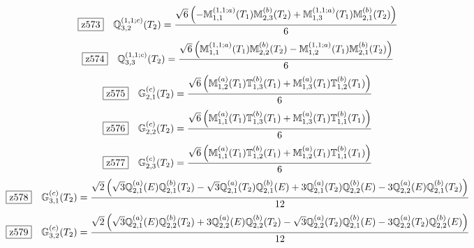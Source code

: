 \documentclass[fleqn,10pt,landscape]{jsarticle}
\begin{document}
\begin{dmath*}
\hspace*{3mm}\fbox{z573}\quad \mathbb{Q}_{3,2}^{(1,1;c)}(T_{2})=\frac{\sqrt{6} \left(- \mathbb{M}_{1,1}^{(1,1;a)}(T_{1}) \mathbb{M}_{2,3}^{(b)}(T_{2}) + \mathbb{M}_{1,3}^{(1,1;a)}(T_{1}) \mathbb{M}_{2,1}^{(b)}(T_{2})\right)}{6}
\end{dmath*}
\begin{dmath*}
\hspace*{3mm}\fbox{z574}\quad \mathbb{Q}_{3,3}^{(1,1;c)}(T_{2})=\frac{\sqrt{6} \left(\mathbb{M}_{1,1}^{(1,1;a)}(T_{1}) \mathbb{M}_{2,2}^{(b)}(T_{2}) - \mathbb{M}_{1,2}^{(1,1;a)}(T_{1}) \mathbb{M}_{2,1}^{(b)}(T_{2})\right)}{6}
\end{dmath*}
\begin{dmath*}
\hspace*{3mm}\fbox{z575}\quad \mathbb{G}_{2,1}^{(c)}(T_{2})=\frac{\sqrt{6} \left(\mathbb{M}_{1,2}^{(a)}(T_{1}) \mathbb{T}_{1,3}^{(b)}(T_{1}) + \mathbb{M}_{1,3}^{(a)}(T_{1}) \mathbb{T}_{1,2}^{(b)}(T_{1})\right)}{6}
\end{dmath*}
\begin{dmath*}
\hspace*{3mm}\fbox{z576}\quad \mathbb{G}_{2,2}^{(c)}(T_{2})=\frac{\sqrt{6} \left(\mathbb{M}_{1,1}^{(a)}(T_{1}) \mathbb{T}_{1,3}^{(b)}(T_{1}) + \mathbb{M}_{1,3}^{(a)}(T_{1}) \mathbb{T}_{1,1}^{(b)}(T_{1})\right)}{6}
\end{dmath*}
\begin{dmath*}
\hspace*{3mm}\fbox{z577}\quad \mathbb{G}_{2,3}^{(c)}(T_{2})=\frac{\sqrt{6} \left(\mathbb{M}_{1,1}^{(a)}(T_{1}) \mathbb{T}_{1,2}^{(b)}(T_{1}) + \mathbb{M}_{1,2}^{(a)}(T_{1}) \mathbb{T}_{1,1}^{(b)}(T_{1})\right)}{6}
\end{dmath*}
\begin{dmath*}
\hspace*{3mm}\fbox{z578}\quad \mathbb{G}_{3,1}^{(c)}(T_{2})=\frac{\sqrt{2} \left(\sqrt{3} \mathbb{Q}_{2,1}^{(a)}(E) \mathbb{Q}_{2,1}^{(b)}(T_{2}) - \sqrt{3} \mathbb{Q}_{2,1}^{(a)}(T_{2}) \mathbb{Q}_{2,1}^{(b)}(E) + 3 \mathbb{Q}_{2,1}^{(a)}(T_{2}) \mathbb{Q}_{2,2}^{(b)}(E) - 3 \mathbb{Q}_{2,2}^{(a)}(E) \mathbb{Q}_{2,1}^{(b)}(T_{2})\right)}{12}
\end{dmath*}
\begin{dmath*}
\hspace*{3mm}\fbox{z579}\quad \mathbb{G}_{3,2}^{(c)}(T_{2})=\frac{\sqrt{2} \left(\sqrt{3} \mathbb{Q}_{2,1}^{(a)}(E) \mathbb{Q}_{2,2}^{(b)}(T_{2}) + 3 \mathbb{Q}_{2,2}^{(a)}(E) \mathbb{Q}_{2,2}^{(b)}(T_{2}) - \sqrt{3} \mathbb{Q}_{2,2}^{(a)}(T_{2}) \mathbb{Q}_{2,1}^{(b)}(E) - 3 \mathbb{Q}_{2,2}^{(a)}(T_{2}) \mathbb{Q}_{2,2}^{(b)}(E)\right)}{12}
\end{dmath*}
\end{document}
